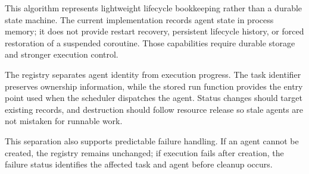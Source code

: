 This algorithm represents lightweight lifecycle bookkeeping rather than a durable state machine. The current implementation records agent state in process memory; it does not provide restart recovery, persistent lifecycle history, or forced restoration of a suspended coroutine. Those capabilities require durable storage and stronger execution control.

The registry separates agent identity from execution progress. The task identifier preserves ownership information, while the stored run function provides the entry point used when the scheduler dispatches the agent. Status changes should target existing records, and destruction should follow resource release so stale agents are not mistaken for runnable work.

This separation also supports predictable failure handling. If an agent cannot be created, the registry remains unchanged; if execution fails after creation, the failure status identifies the affected task and agent before cleanup occurs.

